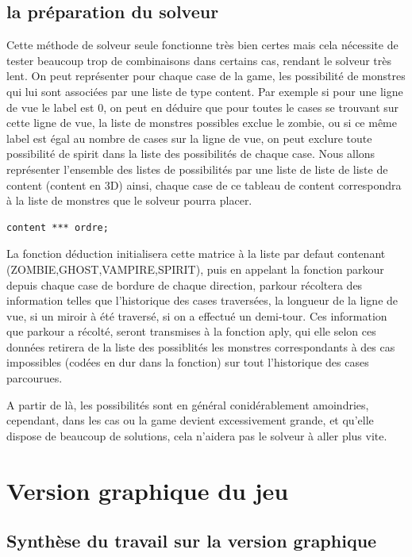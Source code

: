 \documentclass[12]{article}
\begin{document}
\subsection{la préparation du solveur}
Cette méthode de solveur seule fonctionne très bien certes mais cela nécessite de tester beaucoup trop de combinaisons dans certains cas, rendant le solveur très lent.
On peut représenter pour chaque case de la game, les possibilité de monstres qui lui sont associées par une liste de type content. Par exemple si pour une ligne de vue le label est 0, on peut en déduire que pour toutes le cases se trouvant sur cette ligne de vue, la liste de monstres possibles exclue le zombie, ou si ce même label est égal au nombre de cases sur la ligne de vue, on peut exclure toute possibilité de spirit dans la liste des possibilités de chaque case.
\medbreak
Nous allons représenter l'ensemble des listes de possibilités par une liste de liste de liste de content (content en 3D)
ainsi, chaque case de ce tableau de content correspondra à la liste de monstres que le solveur pourra placer.

\begin{lstlisting}[style=CStyle]
  content *** ordre;
\end{lstlisting}
\medbreak
La fonction déduction initialisera cette matrice à la liste par defaut contenant (ZOMBIE,GHOST,VAMPIRE,SPIRIT), puis en appelant la fonction parkour depuis chaque case de bordure de chaque direction, parkour récoltera des information telles que l'historique des cases traversées, la longueur de la ligne de vue, si un miroir à été traversé, si on a effectué un demi-tour.
Ces information que parkour a récolté, seront transmises à la fonction aply, qui elle selon ces données retirera de la liste des possiblités les monstres correspondants à des cas impossibles (codées en dur dans la fonction) sur tout l'historique des cases parcourues.

A partir de là, les possibilités sont en général conidérablement amoindries, cependant, dans les cas ou la game devient excessivement grande, et qu'elle dispose de beaucoup de solutions, cela n'aidera pas le solveur à aller plus vite.
\section{Version graphique du jeu}
\subsection{Synthèse du travail sur la version graphique}
\end{document}
